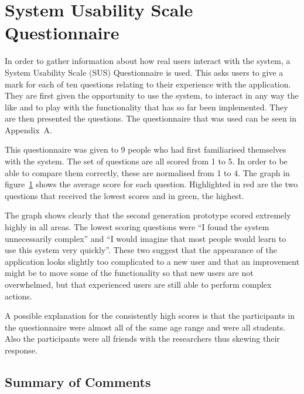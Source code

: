 \section{System Usability Scale Questionnaire}
\label{sec:system_usability_scale_questionnaire}

In order to gather information about how real users interact with the system, a
System Usability Scale (SUS) Questionnaire is used. This asks users to give a
mark for each of ten questions relating to their experience with the
application. They are first given the opportunity to use the system, to
interact in any way the like and to play with the functionality that has so far
been implemented. They are then presented the questions. The questionnaire that
was used can be seen in Appendix~A.

This questionnaire was given to 9 people who had first familiarised themselves
with the system. The set of questions are all scored from 1 to 5. In order to
be able to compare them correctly, these are normalised from 1 to 4. The graph
in figure~\ref{fig:evalGraph} shows the average score for each question.
Highlighted in red are the two questions that received the lowest scores and in
green, the highest.

\begin{figure}[h]
\centering

\caption{}\label{fig:evalGraph}
\end{figure}

The graph shows clearly that the second generation prototype scored extremely
highly in all areas. The lowest scoring questions were ``I found the system
unnecessarily complex'' and ``I would imagine that most people would learn to
use this system very quickly''. These two suggest that the appearance of the
application looks slightly too complicated to a new user and that an
improvement might be to move some of the functionality so that new users are
not overwhelmed, but that experienced users are still able to perform complex
actions.

A possible explanation for the consistently high scores is that the
participants in the questionnaire were almost all of the same age range and
were all students. Also the participants were all friends with the researchers
thus skewing their response.

\subsection{Summary of Comments}
\label{sub:summary_of_comments}

